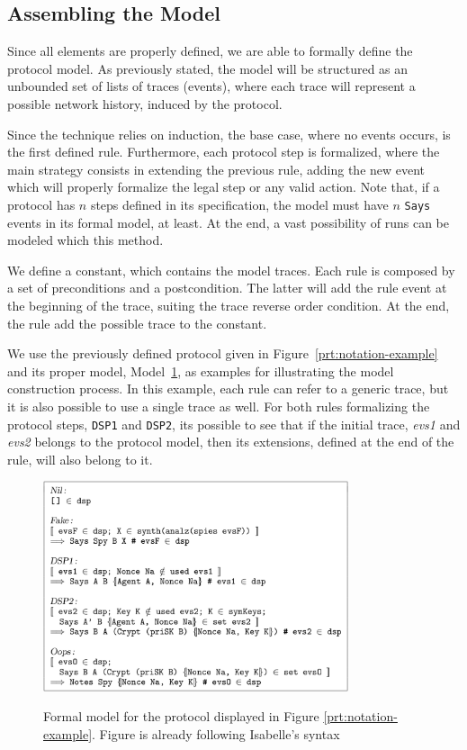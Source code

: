 \subsection{Assembling the Model}
Since all elements are properly defined, we are able to formally define the protocol model. As previously stated, the model will be structured as an unbounded set of lists of traces (events), where each trace will represent a possible network history, induced by the protocol.

Since the technique relies on induction, the base case, where no events occurs, is the first defined rule. Furthermore, each protocol step is formalized, where the main strategy consists in extending the previous rule, adding the new event which will properly formalize the legal step or any valid action. Note that, if a protocol has $n$ steps defined in its specification, the model must have $n$ \texttt{Says} events in its formal model, at least. At the end, a vast possibility of runs can be modeled which this method.

We define a constant, which contains the model traces. Each rule is composed by a set of preconditions and a postcondition. The latter will add the rule event at the beginning of the trace, suiting the trace reverse order condition. At the end, the rule add the possible trace to the constant.

We use the previously defined protocol given in Figure~\ref{prt:notation-example} and its proper model, Model~\ref{fig:notation-example-model}, as examples for illustrating the model construction process. In this example, each rule can refer to a generic trace, but it is also possible to use a single trace as well. For both rules formalizing the protocol steps, \texttt{DSP1} and \texttt{DSP2}, its possible to see that if the initial trace, \textit{evs1} and \textit{evs2} belongs to the protocol model, then its extensions, defined at the end of the rule, will also belong to it.

\begin{figure}
  \centering
  \includegraphics[width=0.8\textwidth]{img/prt-example-model}
  \label{fig:notation-example-model}
  \caption{Formal model for the protocol displayed in Figure \ref{prt:notation-example}. Figure is already following Isabelle's syntax}
\end{figure}

